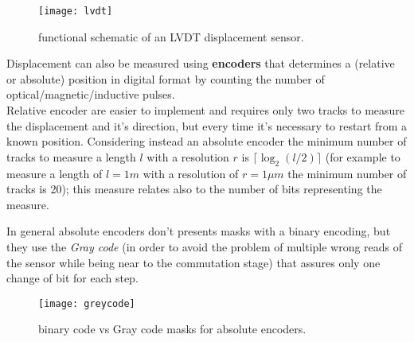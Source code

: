 	\begin{SCfigure}[2][bht]
		\centering \texttt{[image: lvdt]}
		\caption{functional schematic of an LVDT displacement sensor.}
	\end{SCfigure}
	
	Displacement can also be measured using \textbf{encoders} that determines a (relative or absolute) position in digital format by counting the number of optical/magnetic/inductive pulses. \\
	Relative encoder are easier to implement and requires only two tracks to measure the displacement and it's direction, but every time it's necessary to restart from a known position. Considering instead an absolute encoder the minimum number of tracks to measure a length $l$ with a resolution $r$ is $\lceil \log_2 (l/2) \rceil $ (for example to measure a length of $l=1m$ with a resolution of $r=1\mu m$ the minimum number of tracks is 20); this measure relates also to the number of bits representing the measure.
	
	In general absolute encoders don't presents masks with a binary encoding, but they use the \textit{Gray code} (in order to avoid the problem of multiple wrong reads of the sensor while being near to the commutation stage) that assures only one change of bit for each step.
	
	\begin{SCfigure}[1][bht]
		\centering \texttt{[image: greycode]}
		\caption{binary code vs Gray code masks for absolute encoders.}
	\end{SCfigure}
	
